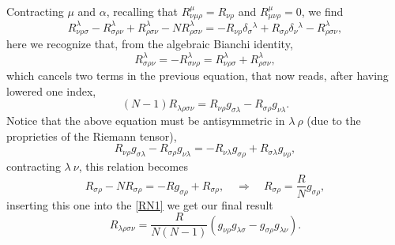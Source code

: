 Contracting $\mu$ and $\alpha$, recalling that $R^\mu_{\nu\mu\rho }=R_{\nu\rho}$ and $R^\mu_{\mu\nu\rho}=0$, we find
$$R^\lambda_{\nu\rho\sigma}-R^\lambda_{\sigma\rho\nu}+R^\lambda_{\rho\sigma\nu}-NR^\lambda_{\rho\sigma\nu}=-R_{\nu\rho}\delta_\sigma\phantom{}^\lambda+R_{\sigma\rho}\delta_\nu\phantom{}^\lambda-R^\lambda_{\rho\sigma\nu},$$
here we recognize that, from the algebraic Bianchi identity, $$R^\lambda_{\sigma\rho\nu}=-R^\lambda_{\sigma\nu\rho}=R^\lambda_{\nu\rho\sigma}+R^\lambda_{\rho\sigma\nu},$$ which cancels two terms in the previous equation, that now reads, after having lowered one index, 
\begin{equation}\label{RN1}
    (N-1)R_{\lambda\rho\sigma\nu}=R_{\nu\rho}g_{\sigma\lambda}-R_{\sigma\rho}g_{\nu\lambda}.
\end{equation}
Notice that the above equation must be antisymmetric in $\lambda\ \rho$ (due to the proprieties of the Riemann tensor),$$
R_{\nu\rho}g_{\sigma\lambda}-R_{\sigma\rho}g_{\nu\lambda}=-R_{\nu\lambda}g_{\sigma\rho}+R_{\sigma\lambda}g_{\nu\rho},
$$ contracting $\lambda\ \nu$, this relation becomes 
\begin{equation}
    R_{\sigma\rho}-NR_{\sigma\rho}=-Rg_{\sigma\rho}+R_{\sigma\rho},\quad \Rightarrow\quad \boxed{R_{\sigma\rho}=\frac{R}{N}g_{\sigma\rho}},
\end{equation}
inserting this one into the \eqref{RN1} we get our final result
\begin{equation}
        \boxed{R_{\lambda\rho\sigma\nu}=\frac{R}{N(N-1)}(g_{\nu\rho}g_{\lambda\sigma}-g_{\sigma\rho}g_{\lambda\nu})}.
\end{equation}